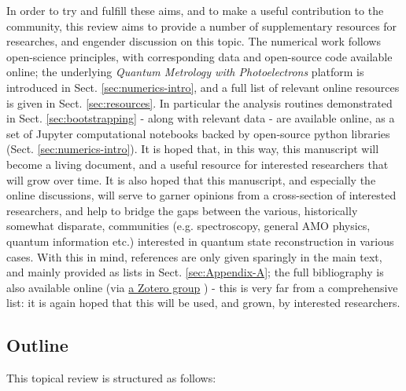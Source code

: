 \documentclass[10pt]{article}
\begin{document}
In order to try and fulfill these aims, and to make a useful contribution to the community, this review aims to provide a number of supplementary resources for researches, and engender discussion on this topic. The numerical work follows open-science principles, with corresponding data and open-source code available online; the underlying \textit{Quantum Metrology with Photoelectrons} platform is introduced in Sect. \ref{sec:numerics-intro}, and a full list of relevant online resources is given in Sect. \ref{sec:resources}.
In particular the analysis routines demonstrated in Sect. \ref{sec:bootstrapping} - along with relevant data - are available online, as a set of Jupyter computational notebooks backed by open-source python libraries (Sect. \ref{sec:numerics-intro}).
It is hoped that, in this way, this manuscript will become a living document, and a useful resource for interested researchers that will grow over time. It is also hoped that this manuscript, and especially the online discussions, will serve  to garner opinions from a cross-section of interested researchers, and help to bridge the gaps between the various, historically somewhat disparate, communities (e.g. spectroscopy, general AMO physics, quantum information etc.) interested in quantum state reconstruction in various cases. With this in mind, references are only given sparingly in the main text, and mainly provided as lists in Sect. \ref{sec:Appendix-A}; the full bibliography is also available online (via \href{https://www.zotero.org/groups/4733878/molecular_frame_pads_measurements_and_reconstruction}{a Zotero group} \cite{hockettZoteroGroupsMolecular}) - this is very far from a comprehensive list: it is again hoped that this will be used, and grown, by interested researchers.

\subsection{Outline}

This topical review is structured as follows:
\end{document}

